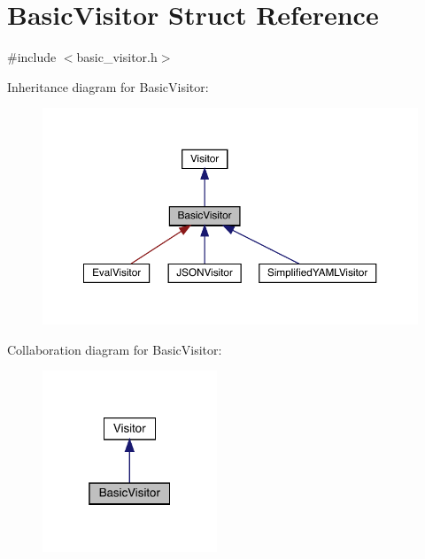 \hypertarget{struct_basic_visitor}{}\section{Basic\+Visitor Struct Reference}
\label{struct_basic_visitor}


{\ttfamily \#include $<$basic\+\_\+visitor.\+h$>$}



Inheritance diagram for Basic\+Visitor\+:
\nopagebreak
\begin{figure}[H]
\begin{center}
\leavevmode
\includegraphics[width=350pt]{struct_basic_visitor__inherit__graph}
\end{center}
\end{figure}


Collaboration diagram for Basic\+Visitor\+:
\nopagebreak
\begin{figure}[H]
\begin{center}
\leavevmode
\includegraphics[width=148pt]{struct_basic_visitor__coll__graph}
\end{center}
\end{figure}
